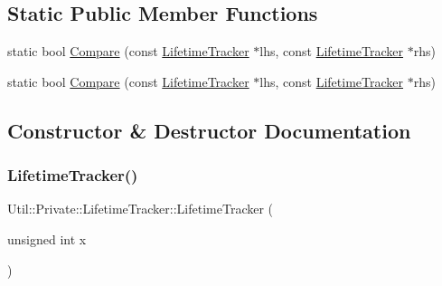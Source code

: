 \subsection*{Static Public Member Functions}
\begin{DoxyCompactItemize}
\item 
static bool \mbox{\hyperlink{classUtil_1_1Private_1_1LifetimeTracker_aa24d4865c53c4f962183ce31276efd7c}{Compare}} (const \mbox{\hyperlink{classUtil_1_1Private_1_1LifetimeTracker}{Lifetime\+Tracker}} $\ast$lhs, const \mbox{\hyperlink{classUtil_1_1Private_1_1LifetimeTracker}{Lifetime\+Tracker}} $\ast$rhs)
\item 
static bool \mbox{\hyperlink{classUtil_1_1Private_1_1LifetimeTracker_aa24d4865c53c4f962183ce31276efd7c}{Compare}} (const \mbox{\hyperlink{classUtil_1_1Private_1_1LifetimeTracker}{Lifetime\+Tracker}} $\ast$lhs, const \mbox{\hyperlink{classUtil_1_1Private_1_1LifetimeTracker}{Lifetime\+Tracker}} $\ast$rhs)
\end{DoxyCompactItemize}


\subsection{Constructor \& Destructor Documentation}
\mbox{\label{classUtil_1_1Private_1_1LifetimeTracker_adfc292ac14a2b71f88059accf8925772}} 
\subsubsection{\texorpdfstring{LifetimeTracker()}{LifetimeTracker()}\hspace{0.1cm}{\footnotesize\ttfamily [1/2]}}
{\footnotesize\ttfamily Util\+::\+Private\+::\+Lifetime\+Tracker\+::\+Lifetime\+Tracker (\begin{DoxyParamCaption}\item[{unsigned int}]{x }\end{DoxyParamCaption})\hspace{0.3cm}{\ttfamily [inline]}}

\mbox{\label{classUtil_1_1Private_1_1LifetimeTracker_aa4c2c67352679440491759ed6fd0a7e4}} 
